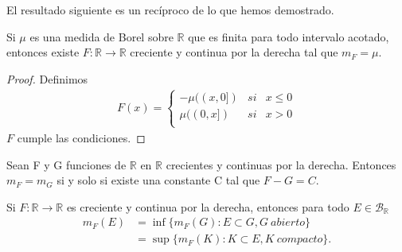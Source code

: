 \begin{itemize}
          El resultado siguiente es un recíproco de lo que hemos demostrado.
          \begin{teo}
              Si $\mu$ es una medida de Borel sobre $\mathbb{R}$ que es finita para todo intervalo acotado, entonces existe $F: \mathbb{R} \longrightarrow \mathbb{R}$ creciente y continua por la derecha tal que $m_F = \mu$.
          \end{teo}
          \begin{proof}
              Definimos
              \begin{align*}
                  F(x) = \left\{ \begin{array}{lcc}
                                     -\mu((x,0]) & si & x \leq 0 \\
                                     \mu((0,x])  & si & x > 0    \\
                                 \end{array}
                  \right.
              \end{align*}
              $F$ cumple las condiciones.
          \end{proof}
\end{itemize}

\begin{prop}
    Sean F y G funciones de $\mathbb{R}$ en $\mathbb{R}$ crecientes y continuas por la derecha. Entonces $m_F = m_G$ si y solo si existe una constante C tal que $F - G = C$.
\end{prop}

\begin{teo}
    Si $F: \mathbb{R} \longrightarrow \mathbb{R}$ es creciente y continua por la derecha, entonces para todo
    $E \in \mathcal{B}_{\mathbb{R}}$
    \begin{align*}
        m_F(E) & = \inf \{ m_F(G) : E \subset G, G \ abierto \}   \\
               & = \sup \{ m_F(K) : K \subset E, K \ compacto \}.
    \end{align*}
\end{teo}

